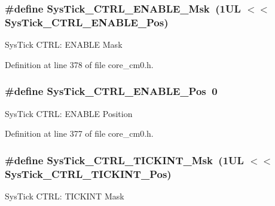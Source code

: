 \subsubsection[{\texorpdfstring{Sys\+Tick\+\_\+\+C\+T\+R\+L\+\_\+\+E\+N\+A\+B\+L\+E\+\_\+\+Msk}{SysTick_CTRL_ENABLE_Msk}}]{\setlength{\rightskip}{0pt plus 5cm}\#define Sys\+Tick\+\_\+\+C\+T\+R\+L\+\_\+\+E\+N\+A\+B\+L\+E\+\_\+\+Msk~(1\+U\+L $<$$<$ Sys\+Tick\+\_\+\+C\+T\+R\+L\+\_\+\+E\+N\+A\+B\+L\+E\+\_\+\+Pos)}\hypertarget{group___c_m_s_i_s___sys_tick_ga16c9fee0ed0235524bdeb38af328fd1f}{}\label{group___c_m_s_i_s___sys_tick_ga16c9fee0ed0235524bdeb38af328fd1f}
Sys\+Tick C\+T\+RL\+: E\+N\+A\+B\+LE Mask 

Definition at line 378 of file core\+\_\+cm0.\+h.

\subsubsection[{\texorpdfstring{Sys\+Tick\+\_\+\+C\+T\+R\+L\+\_\+\+E\+N\+A\+B\+L\+E\+\_\+\+Pos}{SysTick_CTRL_ENABLE_Pos}}]{\setlength{\rightskip}{0pt plus 5cm}\#define Sys\+Tick\+\_\+\+C\+T\+R\+L\+\_\+\+E\+N\+A\+B\+L\+E\+\_\+\+Pos~0}\hypertarget{group___c_m_s_i_s___sys_tick_ga0b48cc1e36d92a92e4bf632890314810}{}\label{group___c_m_s_i_s___sys_tick_ga0b48cc1e36d92a92e4bf632890314810}
Sys\+Tick C\+T\+RL\+: E\+N\+A\+B\+LE Position 

Definition at line 377 of file core\+\_\+cm0.\+h.

\subsubsection[{\texorpdfstring{Sys\+Tick\+\_\+\+C\+T\+R\+L\+\_\+\+T\+I\+C\+K\+I\+N\+T\+\_\+\+Msk}{SysTick_CTRL_TICKINT_Msk}}]{\setlength{\rightskip}{0pt plus 5cm}\#define Sys\+Tick\+\_\+\+C\+T\+R\+L\+\_\+\+T\+I\+C\+K\+I\+N\+T\+\_\+\+Msk~(1\+U\+L $<$$<$ Sys\+Tick\+\_\+\+C\+T\+R\+L\+\_\+\+T\+I\+C\+K\+I\+N\+T\+\_\+\+Pos)}\hypertarget{group___c_m_s_i_s___sys_tick_ga95bb984266ca764024836a870238a027}{}\label{group___c_m_s_i_s___sys_tick_ga95bb984266ca764024836a870238a027}
Sys\+Tick C\+T\+RL\+: T\+I\+C\+K\+I\+NT Mask 

